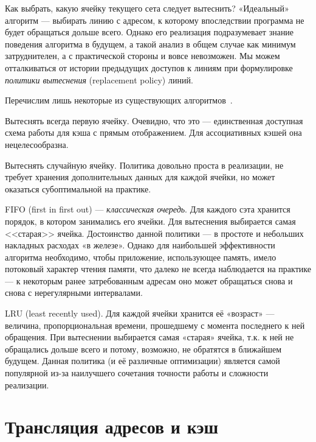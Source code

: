 Как выбрать, какую ячейку текущего сета следует вытеснить? «Идеальный» алгоритм --- выбирать линию с адресом, к которому впоследствии программа не будет обращаться дольше всего. Однако  его реализация подразумевает знание поведения алгоритма в будущем, а такой анализ в общем случае как минимум затруднителен, а с практической стороны и вовсе невозможен. Мы можем отталкиваться от истории предыдущих доступов к линиям при формулировке \textit{политики вытеснения} (\abbr replacement policy) линий.

Перечислим лишь некоторые из существующих алгоритмов~\cite{arc}.

\begin{itemize*}
\item    Вытеснять всегда первую ячейку. Очевидно, что это --- единственная доступная схема работы для кэша с прямым отображением. Для ассоциативных кэшей она нецелесообразна.

\item    Вытеснять случайную ячейку. Политика довольно проста в реализации, не требует хранения дополнительных данных для каждой ячейки, но может оказаться субоптимальной на практике.

\item    FIFO (\abbr first in first out) --- \textit{классическая очередь}. Для каждого сэта хранится порядок, в котором занимались его ячейки. Для вытеснения выбирается самая <<старая>> ячейка. Достоинство данной политики --- в простоте и небольших накладных расходах «в железе». Однако для наибольшей эффективности алгоритма необходимо, чтобы приложение, использующее память, имело потоковый характер чтения памяти, что далеко не всегда наблюдается на практике --- к некоторым ранее затребованным адресам оно может обращаться снова и снова с нерегулярными интервалами.

\item    LRU (\abbr least recently used). Для каждой ячейки хранится её «возраст» --- величина, пропорциональная времени, прошедшему с момента последнего к ней обращения. При вытеснении выбирается самая «старая» ячейка, т.к. к ней не обращались дольше всего и потому, возможно, не обратятся в ближайшем будущем. Данная политика (и её различные оптимизации) является самой популярной из-за наилучшего сочетания точности работы и сложности реализации.

\end{itemize*}

\section{Трансляция адресов и кэш}


